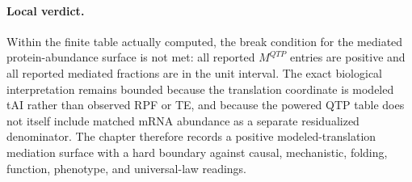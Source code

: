 \paragraph{Local verdict.}
Within the finite table actually computed, the break condition for the mediated protein-abundance surface is not met: all reported $M^{QTP}$ entries are positive and all reported mediated fractions are in the unit interval.  The exact biological interpretation remains bounded because the translation coordinate is modeled tAI rather than observed RPF or TE, and because the powered QTP table does not itself include matched mRNA abundance as a separate residualized denominator.  The chapter therefore records a positive modeled-translation mediation surface with a hard boundary against causal, mechanistic, folding, function, phenotype, and universal-law readings.
